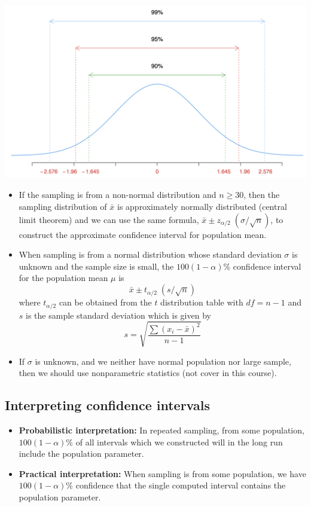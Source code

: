 \documentclass[
]{article}
\begin{document}
\begin{center}\includegraphics[width=1\linewidth,height=1\textheight]{snormdist2} \end{center}

\begin{itemize}
\item
  If the sampling is from a non-normal distribution and \(n \geq 30\),
  then the sampling distribution of \(\bar{x}\) is approximately
  normally distributed (central limit theorem) and we can use the same
  formula, \(\bar{x}\pm z_{\alpha /2} \; (\sigma /\sqrt{n} )\), to
  construct the approximate confidence interval for population mean.
\item
  When sampling is from a normal distribution whose standard deviation
  \(\sigma\) is unknown and the sample size is small, the
  \(100(1-\alpha)\%\) confidence interval for the population mean
  \(\mu\) is \[ \bar{x}\pm t_{\alpha /2} \; (s /\sqrt{n} )\] where
  \(t_{\alpha/2}\) can be obtained from the \(t\) distribution table
  with \(df=n-1\) and \(s\) is the sample standard deviation which is
  given by \[s=\sqrt{\frac{\sum(x_i-\bar{x})^2}{n-1}}\]
\item
  If \(\sigma\) is unknown, and we neither have normal population nor
  large sample, then we should use nonparametric statistics (not cover
  in this course).
\end{itemize}

\hypertarget{interpreting-confidence-intervals}{%
\subsection{Interpreting confidence
intervals}\label{interpreting-confidence-intervals}}

\begin{itemize}
\item
  \textbf{Probabilistic interpretation:} In repeated sampling, from some
  population, \(100(1-\alpha)\%\) of all intervals which we constructed
  will in the long run include the population parameter.
\item
  \textbf{Practical interpretation:} When sampling is from some
  population, we have \(100(1-\alpha)\%\) confidence that the single
  computed interval contains the population parameter.
\end{itemize}
\end{document}

